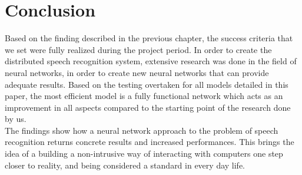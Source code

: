 \chapter{Conclusion}\label{ch:conclusion}


Based on the finding described in the previous chapter, the success criteria that we set were fully realized during the project period. In order to create the distributed speech recognition system, extensive research was done in the field of neural networks, in order to create new neural networks that can provide adequate results. Based on the testing overtaken for all models detailed in this paper, the most efficient model is a fully functional network which acts as an improvement in all aspects compared to the starting point of the research done by us. 
\\

The findings show how a neural network approach to the problem of speech recognition returns concrete results and increased performances. This brings the idea of a building a non-intrusive way of interacting with computers one step closer to reality, and being considered a standard in every day life.
 